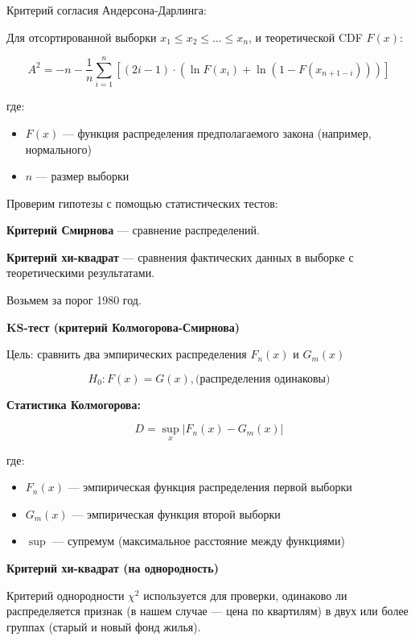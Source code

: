 \documentclass[12pt]{article}
\begin{document}
	Критерий согласия Андерсона-Дарлинга:
	
	Для отсортированной выборки $ x_1 \le x_2 \le \dots \le x_n $, и теоретической CDF $ F(x) $:
	
	$$ A^2 = -n - \frac{1}{n} \sum_{i=1}^{n} \left[ (2i - 1) \cdot \left( \ln F(x_i) + \ln (1 - F(x_{n+1-i})) \right) \right] $$
	
	где:
	\begin{itemize}
		\item $ F(x) $ — функция распределения предполагаемого закона (например, нормального)
		\item $ n $ — размер выборки
	\end{itemize}
	\vspace*{1em}
	
	Проверим гипотезы с помощью статистических тестов:
	\vspace*{1em}
	
	\textbf{Критерий Смирнова} — сравнение распределений.
	
	\textbf{Критерий хи-квадрат} — сравнения фактических данных в выборке с теоретическими результатами.
	
	Возьмем за порог 1980 год.
	\vspace*{3em}
	
	\textbf{KS-тест (критерий Колмогорова-Смирнова)}
	
	Цель: сравнить два эмпирических распределения $ F_n(x) $ и $ G_m(x) $
	
	$$ H_0: F(x) = G(x), \text{(распределения одинаковы)} $$
	
	\textbf{Статистика Колмогорова: }
	
	$$ D = \sup_x |F_n(x) - G_m(x)| $$
	
	где:
	\begin{itemize}
		\item $ F_n(x) $ — эмпирическая функция распределения первой выборки
		\item $ G_m(x) $ — эмпирическая функция второй выборки
		\item $ \sup $ — супремум (максимальное расстояние между функциями)
	\end{itemize}
	\vspace*{1em}
	
	\textbf{Критерий хи-квадрат (на однородность)}
	
	Критерий однородности $\chi^2$ используется для проверки, одинаково ли распределяется признак (в нашем случае — цена по квартилям) в двух или более группах (старый и новый фонд жилья).
	
\end{document}
